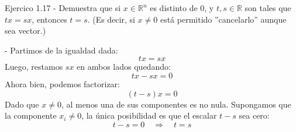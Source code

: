 \documentclass[11pt,letterpaper]{article}
\begin{document}
\begin{inciso}{Ejercico 1.17}
- Demuestra que si \( x \in \mathbb{R}^n \) es distinto de \( 0 \), y \( t, s \in \mathbb{R} \) son tales que \( tx = sx \), entonces \( t = s \). (Es decir, si \( x \neq 0 \) está permitido ''cancelarlo'' aunque sea vector.)

\begin{demostracion}{}
- Partimos de la igualdad dada: 
\begin{equation*}
    tx=sx
\end{equation*}
Luego, restamos $sx$ en ambos lados quedando: 
\begin{equation*}
    tx - sx = 0
\end{equation*}
Ahora bien, podemos factorizar: 
\begin{equation*}
    (t-s)x=0
\end{equation*}
Dado que $x \neq 0$, al menos una de sus componentes es no nula. Supongamos que la componente $x_i \neq 0$, la única posibilidad es que el escalar $t-s$ sea cero: 
\begin{equation*}
    t-s=0 \quad \Rightarrow \quad t=s
\end{equation*}


\end{demostracion}
\end{inciso}
\end{document}
